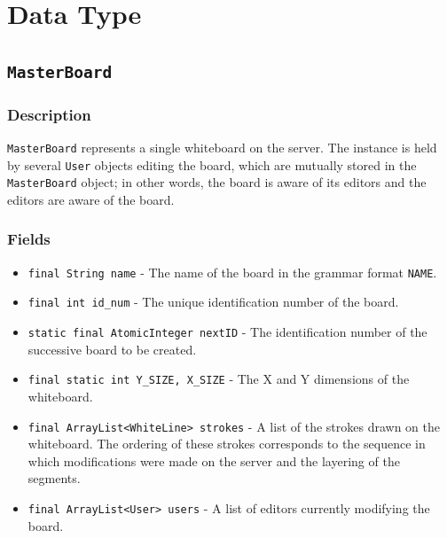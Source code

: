 \section{Data Type}

\subsection{\texttt{MasterBoard}}

\subsubsection{Description}
\texttt{MasterBoard} represents a single whiteboard on the server. The instance is held by several \texttt{User} objects editing the board, which are mutually stored in the \texttt{MasterBoard} object; in other words, the board is aware of its editors and the editors are aware of the board.

\subsubsection{Fields}
\begin{itemize}
\item \texttt{final String name} - The name of the board in the grammar format \texttt{NAME}.
\item \texttt{final int id\_num} - The unique identification number of the board.
\item \texttt{static final AtomicInteger nextID} - The identification number of the successive board to be created.
\item \texttt{final static int Y\_SIZE, X\_SIZE} - The X and Y dimensions of the whiteboard.
\item \texttt{final ArrayList<WhiteLine> strokes} - A list of the strokes drawn on the whiteboard. The ordering of these strokes corresponds to the sequence in which modifications were made on the server and the layering of the segments.
\item \texttt{final ArrayList<User> users} - A list of editors currently modifying the board.
\end{itemize}

